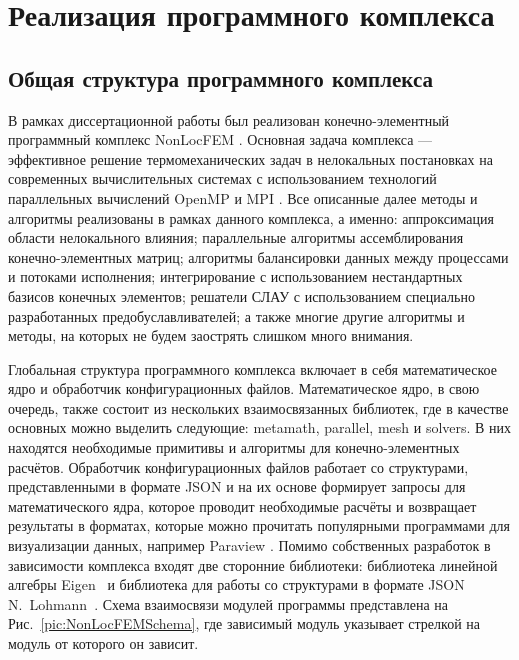 \chapter{Реализация программного комплекса}\label{ch:ProgramComplex}

\section{Общая структура программного комплекса}\label{sec:ProgramComplex/GeneralStructure}

В рамках диссертационной работы был реализован конечно-элементный программный комплекс NonLocFEM \cite{NonLocFEM}. Основная задача комплекса --- эффективное решение термомеханических задач в нелокальных постановках на современных вычислительных системах с использованием технологий параллельных вычислений OpenMP \cite{OpenMP} и MPI \cite{MPI}. Все описанные далее методы и алгоритмы реализованы в рамках данного комплекса, а именно: аппроксимация области нелокального влияния; параллельные алгоритмы ассемблирования конечно-элементных матриц; алгоритмы балансировки данных между процессами и потоками исполнения; интегрирование с использованием нестандартных базисов конечных элементов; решатели СЛАУ с использованием специально разработанных предобуславливателей; а также многие другие алгоритмы и методы, на которых не будем заострять слишком много внимания.

Глобальная структура программного комплекса включает в себя математическое ядро и обработчик конфигурационных файлов. Математическое ядро, в свою очередь, также состоит из нескольких взаимосвязанных библиотек, где в качестве основных можно выделить следующие: metamath, parallel, mesh и solvers. В них находятся необходимые примитивы и алгоритмы для конечно-элементных расчётов. Обработчик конфигурационных файлов работает со структурами, представленными в формате JSON \cite{JSONShema} и на их основе формирует запросы для математического ядра, которое проводит необходимые расчёты и возвращает результаты в форматах, которые можно прочитать популярными программами для визуализации данных, например Paraview \cite{Paraview}. Помимо собственных разработок в зависимости комплекса входят две сторонние библиотеки: библиотека линейной алгебры Eigen~\cite{EigenLib} и библиотека для работы со структурами в формате JSON N.~Lohmann~\cite{NlohmannJson}. Схема взаимосвязи модулей программы представлена на Рис.~\ref{pic:NonLocFEMSchema}, где зависимый модуль указывает стрелкой на модуль от которого он зависит.

